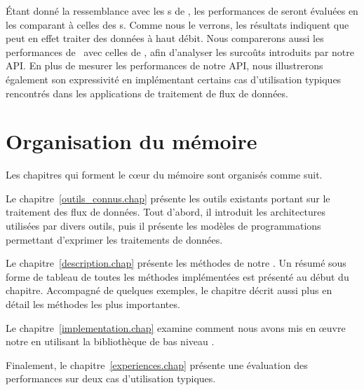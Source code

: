 \begin{introduction}
\'Etant donn\'e la ressemblance avec les s de ,
les performances de  seront \'evalu\'ees en les comparant \`a celles des s. Comme nous le verrons, les r\'esultats indiquent que  peut en effet traiter des donn\'ees \`a haut d\'ebit.
%
Nous comparerons aussi les performances de \ppff\ avec celles de
, afin d'analyser les surco\^uts introduits par notre API.
%
En plus de mesurer les performances de notre API, nous illustrerons \'egalement son expressivit\'e en impl\'ementant certains cas d'utilisation typiques rencontr\'es dans les applications de traitement de flux de donn\'ees.


\section*{Organisation du m\'emoire}

Les chapitres qui forment le c\oe{}ur du m\'emoire sont organis\'es
comme suit.


Le chapitre~\ref{outils_connus.chap}  pr\'esente les outils existants portant sur le traitement des flux de donn\'ees.  Tout d'abord, il introduit les architectures utilis\'ees par divers outils, puis il pr\'esente les mod\`eles de programmations permettant d'exprimer les traitements de donn\'ees.

Le chapitre~\ref{description.chap}  pr\'esente les m\'ethodes de notre . Un r\'esum\'e sous forme de tableau de toutes les m\'ethodes implément\'ees est pr\'esent\'e au d\'ebut du chapitre. Accompagn\'e de quelques exemples, le chapitre d\'ecrit aussi plus en d\'etail les m\'ethodes les plus importantes.

Le chapitre~\ref{implementation.chap}  examine comment nous avons mis en œuvre notre  en utilisant la biblioth\`eque de bas niveau .

Finalement, le chapitre~\ref{experiences.chap}  pr\'esente une \'evaluation des performances sur deux cas d'utilisation typiques.

\end{introduction}


